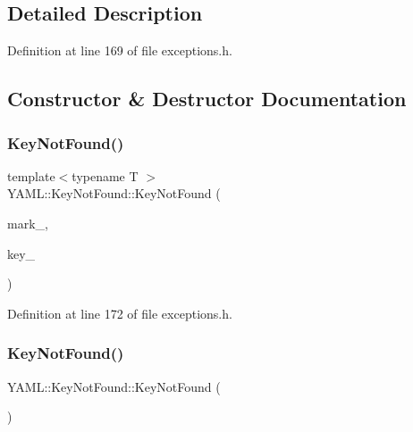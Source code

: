 \subsection{Detailed Description}


Definition at line 169 of file exceptions.\+h.



\subsection{Constructor \& Destructor Documentation}
\mbox{\label{class_y_a_m_l_1_1_key_not_found_abbd5edd424ef3feb366f31deb004407e}} 
\subsubsection{\texorpdfstring{KeyNotFound()}{KeyNotFound()}\hspace{0.1cm}{\footnotesize\ttfamily [1/2]}}
{\footnotesize\ttfamily template$<$typename T $>$ \\
Y\+A\+M\+L\+::\+Key\+Not\+Found\+::\+Key\+Not\+Found (\begin{DoxyParamCaption}\item[{const \mbox{\hyperlink{struct_y_a_m_l_1_1_mark}{Mark}} \&}]{mark\+\_\+,  }\item[{const T \&}]{key\+\_\+ }\end{DoxyParamCaption})\hspace{0.3cm}{\ttfamily [inline]}}



Definition at line 172 of file exceptions.\+h.

\mbox{\label{class_y_a_m_l_1_1_key_not_found_ad7494209afc5a2603cef2bea0a07cf1c}} 
\subsubsection{\texorpdfstring{KeyNotFound()}{KeyNotFound()}\hspace{0.1cm}{\footnotesize\ttfamily [2/2]}}
{\footnotesize\ttfamily Y\+A\+M\+L\+::\+Key\+Not\+Found\+::\+Key\+Not\+Found (\begin{DoxyParamCaption}\item[{const \mbox{\hyperlink{class_y_a_m_l_1_1_key_not_found}{Key\+Not\+Found}} \&}]{ }\end{DoxyParamCaption})\hspace{0.3cm}{\ttfamily [default]}}

